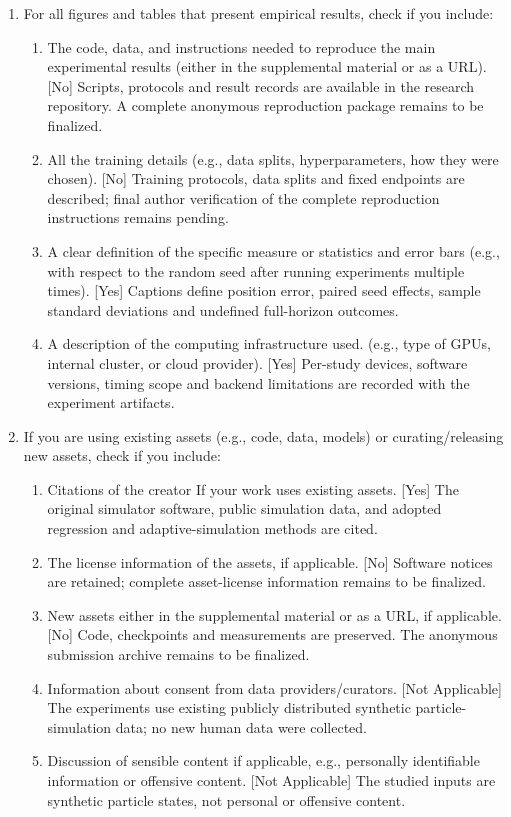 \begin{enumerate}
  \item For all figures and tables that present empirical results, check if you include:
  \begin{enumerate}
    \item The code, data, and instructions needed to reproduce the main experimental results (either in the supplemental material or as a URL). [No] Scripts, protocols and result records are available in the research repository. A complete anonymous reproduction package remains to be finalized.
    \item All the training details (e.g., data splits, hyperparameters, how they were chosen). [No] Training protocols, data splits and fixed endpoints are described; final author verification of the complete reproduction instructions remains pending.
    \item A clear definition of the specific measure or statistics and error bars (e.g., with respect to the random seed after running experiments multiple times). [Yes] Captions define position error, paired seed effects, sample standard deviations and undefined full-horizon outcomes.
    \item A description of the computing infrastructure used. (e.g., type of GPUs, internal cluster, or cloud provider). [Yes] Per-study devices, software versions, timing scope and backend limitations are recorded with the experiment artifacts.
  \end{enumerate}

  \item If you are using existing assets (e.g., code, data, models) or curating/releasing new assets, check if you include:
  \begin{enumerate}
    \item Citations of the creator If your work uses existing assets. [Yes] The original simulator software, public simulation data, and adopted regression and adaptive-simulation methods are cited.
    \item The license information of the assets, if applicable. [No] Software notices are retained; complete asset-license information remains to be finalized.
    \item New assets either in the supplemental material or as a URL, if applicable. [No] Code, checkpoints and measurements are preserved. The anonymous submission archive remains to be finalized.
    \item Information about consent from data providers/curators. [Not Applicable] The experiments use existing publicly distributed synthetic particle-simulation data; no new human data were collected.
    \item Discussion of sensible content if applicable, e.g., personally identifiable information or offensive content. [Not Applicable] The studied inputs are synthetic particle states, not personal or offensive content.
  \end{enumerate}


\end{enumerate}
